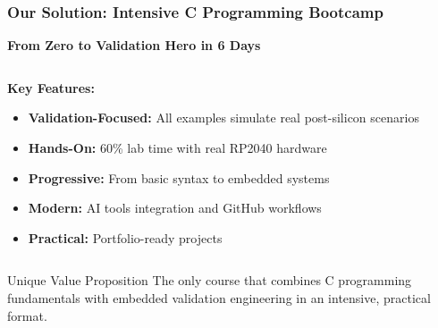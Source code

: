\documentclass{beamer}
\begin{document}
\begin{frame}
\frametitle{Our Solution: Intensive C Programming Bootcamp}

\begin{center}
\Large \textbf{From Zero to Validation Hero in 6 Days}
\end{center}

\vspace{0.5cm}

\begin{columns}
\begin{column}{0.6\textwidth}
\textbf{Key Features:}
\begin{itemize}
    \item \textcolor{courseblue}{\textbf{Validation-Focused:}} All examples simulate real post-silicon scenarios
    \item \textcolor{courseblue}{\textbf{Hands-On:}} 60\% lab time with real RP2040 hardware
    \item \textcolor{courseblue}{\textbf{Progressive:}} From basic syntax to embedded systems
    \item \textcolor{courseblue}{\textbf{Modern:}} AI tools integration and GitHub workflows
    \item \textcolor{courseblue}{\textbf{Practical:}} Portfolio-ready projects
\end{itemize}
\end{column}
\begin{column}{0.4\textwidth}
\begin{center}
\end{center}
\end{column}
\end{columns}

\vspace{0.5cm}
\begin{exampleblock}{Unique Value Proposition}
The only course that combines C programming fundamentals with embedded validation engineering in an intensive, practical format.
\end{exampleblock}
\end{frame}
\end{document}
